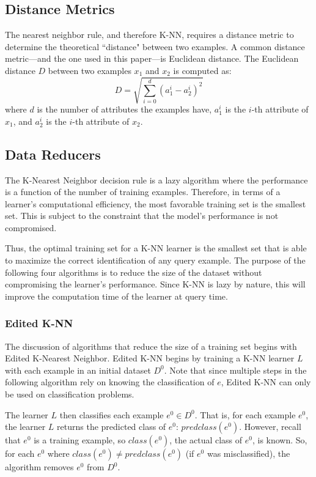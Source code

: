 \documentclass[twoside,11pt]{article}
\begin{document}
\subsection{Distance Metrics}

The nearest neighbor rule, and therefore K-NN, requires a distance metric to determine the theoretical ``distance" between two examples. A common distance metric---and the one used in this paper---is Euclidean distance. The Euclidean distance $D$ between two examples $x_1$ and $x_2$ is computed as:
$$D = \sqrt{\sum_{i=0}^{d}(a_1^i - a_2^i)^2}$$
where $d$ is the number of attributes the examples have, $a_1^i$ is the $i$-th attribute of $x_1$, and $a_2^i$ is the $i$-th attribute of $x_2$.

\subsection{Data Reducers}
The K-Nearest Neighbor decision rule is a lazy algorithm where the performance is a function of the number of training examples. Therefore, in terms of a learner's computational efficiency, the most favorable training set is the smallest set.
This is subject to the constraint that the model's performance is not compromised.

Thus, the optimal training set for a K-NN learner is the smallest set that is able to maximize the correct identification of any query example.
The purpose of the following four algorithms is to reduce the size of the dataset without compromising the learner's performance. Since K-NN is lazy by nature, this will improve the computation time of the learner at query time.


\subsubsection{Edited K-NN}
The discussion of algorithms that reduce the size of a training set begins with Edited K-Nearest Neighbor. Edited K-NN begins by training a K-NN learner $L$ with each example in an initial dataset $D^0$. Note that since multiple steps in the following algorithm rely on knowing the classification of $e$, Edited K-NN can only be used on classification problems.

The learner $L$ then classifies each example $e^0 \in D^0$. That is, for each example $e^0$, the learner $L$ returns the predicted class of $e^0$: $predclass(e^0)$. However, recall that $e^0$ is a training example, so $class(e^0)$, the actual class of $e^0$, is known. So, for each $e^0$ where $class(e^0) \neq predclass(e^0)$ (if $e^0$ was misclassified), the algorithm removes $e^0$ from $D^0$.
\end{document}
